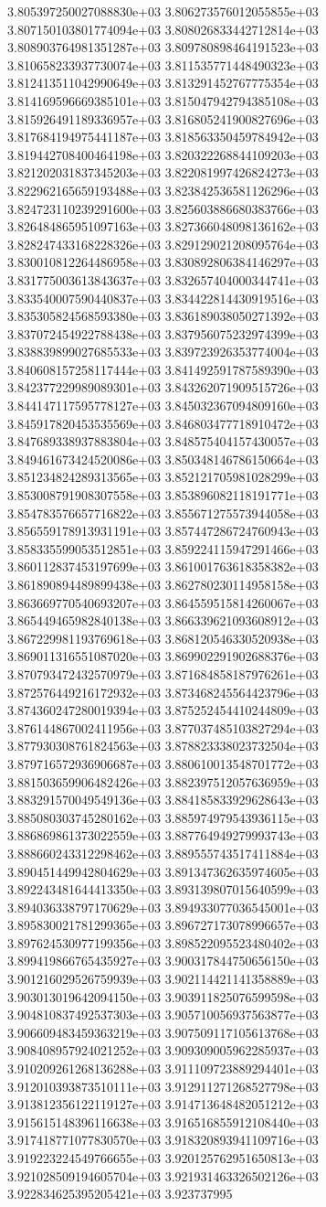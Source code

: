 3.805397250027088830e+03	3.806273576012055855e+03	3.807150103801774094e+03	3.808026833442712814e+03	3.808903764981351287e+03	3.809780898464191523e+03	3.810658233937730074e+03	3.811535771448490323e+03	3.812413511042990649e+03	3.813291452767775354e+03	3.814169596669385101e+03	3.815047942794385108e+03	3.815926491189336957e+03	3.816805241900827696e+03	3.817684194975441187e+03	3.818563350459784942e+03	3.819442708400464198e+03	3.820322268844109203e+03	3.821202031837345203e+03	3.822081997426824273e+03	3.822962165659193488e+03	3.823842536581126296e+03	3.824723110239291600e+03	3.825603886680383766e+03	3.826484865951097163e+03	3.827366048098136162e+03	3.828247433168228326e+03	3.829129021208095764e+03	3.830010812264486958e+03	3.830892806384146297e+03	3.831775003613843637e+03	3.832657404000344741e+03	3.833540007590440837e+03	3.834422814430919516e+03	3.835305824568593380e+03	3.836189038050271392e+03	3.837072454922788438e+03	3.837956075232974399e+03	3.838839899027685533e+03	3.839723926353774004e+03	3.840608157258117444e+03	3.841492591787589390e+03	3.842377229989089301e+03	3.843262071909515726e+03	3.844147117595778127e+03	3.845032367094809160e+03	3.845917820453535569e+03	3.846803477718910472e+03	3.847689338937883804e+03	3.848575404157430057e+03	3.849461673424520086e+03	3.850348146786150664e+03	3.851234824289313565e+03	3.852121705981028299e+03	3.853008791908307558e+03	3.853896082118191771e+03	3.854783576657716822e+03	3.855671275573944058e+03	3.856559178913931191e+03	3.857447286724760943e+03	3.858335599053512851e+03	3.859224115947291466e+03	3.860112837453197699e+03	3.861001763618358382e+03	3.861890894489899438e+03	3.862780230114958158e+03	3.863669770540693207e+03	3.864559515814260067e+03	3.865449465982840138e+03	3.866339621093608912e+03	3.867229981193769618e+03	3.868120546330520938e+03	3.869011316551087020e+03	3.869902291902688376e+03	3.870793472432570979e+03	3.871684858187976261e+03	3.872576449216172932e+03	3.873468245564423796e+03	3.874360247280019394e+03	3.875252454410244809e+03	3.876144867002411956e+03	3.877037485103827294e+03	3.877930308761824563e+03	3.878823338023732504e+03	3.879716572936906687e+03	3.880610013548701772e+03	3.881503659906482426e+03	3.882397512057636959e+03	3.883291570049549136e+03	3.884185833929628643e+03	3.885080303745280162e+03	3.885974979543936115e+03	3.886869861373022559e+03	3.887764949279993743e+03	3.888660243312298462e+03	3.889555743517411884e+03	3.890451449942804629e+03	3.891347362635974605e+03	3.892243481644413350e+03	3.893139807015640599e+03	3.894036338797170629e+03	3.894933077036545001e+03	3.895830021781299365e+03	3.896727173078996657e+03	3.897624530977199356e+03	3.898522095523480402e+03	3.899419866765435927e+03	3.900317844750656150e+03	3.901216029526759939e+03	3.902114421141358889e+03	3.903013019642094150e+03	3.903911825076599598e+03	3.904810837492537303e+03	3.905710056937563877e+03	3.906609483459363219e+03	3.907509117105613768e+03	3.908408957924021252e+03	3.909309005962285937e+03	3.910209261268136288e+03	3.911109723889294401e+03	3.912010393873510111e+03	3.912911271268527798e+03	3.913812356122119127e+03	3.914713648482051212e+03	3.915615148396116638e+03	3.916516855912108440e+03	3.917418771077830570e+03	3.918320893941109716e+03	3.919223224549766655e+03	3.920125762951650813e+03	3.921028509194605704e+03	3.921931463326502126e+03	3.922834625395205421e+03	3.923737995